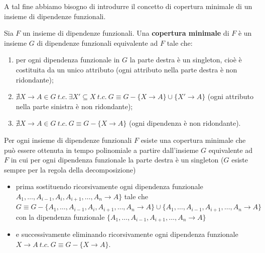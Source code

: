 A tal fine abbiamo bisogno di introdurre il concetto di copertura minimale di un insieme di dipendenze funzionali.
\begin{defn}
Sia $F$ un insieme di dipendenze funzionali. Una \textbf{copertura minimale} di $F$ è un insieme $G$ di dipendenze 
funzionali equivalente ad $F$ tale che:
\begin{enumerate}
 \item per ogni dipendenza funzionale in $G$ la parte destra è un singleton, cioè è costituita da un unico
attributo (ogni attributo nella parte destra è non ridondante);
 \item $\nexists X \rightarrow A \in G\ t.c.\ \exists X' \subseteq X\ t.c.\ G \equiv G - \{X \rightarrow A\} 
 \cup \{X' \rightarrow A\}$ (ogni attributo nella parte sinistra è non ridondante);
 \item $\nexists X \rightarrow A \in G\ t.c.\ G \equiv G - \{X \rightarrow A\}$ (ogni dipendenza è non ridondante). 
\end{enumerate}
\end{defn}
Per ogni insieme di dipendenze funzionali $F$ esiste una copertura minimale che può essere ottenuta in tempo polinomiale
a partire dall'insieme $G$ equivalente ad $F$ in cui per ogni dipendenza funzionale la parte destra è un singleton 
($G$ esiste sempre per la regola della decomposizione)
\begin{itemize}
 \item prima sostituendo ricorsivamente ogni dipendenza funzionale $A_1, \ldots, A_{i-1}, A_i, A_{i+1}, \ldots, A_n 
 \rightarrow A\}$ tale che $G \equiv G - \{A_1, \ldots, A_{i-1}, A_i, A_{i+1}, \ldots, A_n \rightarrow A\} \cup 
 \{A_1, \ldots, A_{i-1}, A_{i+1}, \ldots, A_n \rightarrow A\}$ con la dipendenza funzionale $\{A_1, \ldots, A_{i-1}, A_{i+1},
 \ldots, A_n \rightarrow A\}$
 \item e successivamente eliminando ricorsivamente ogni dipendenza funzionale $X \rightarrow A\ t.c.\ G \equiv G- 
 \{X \rightarrow A\}$.
\end{itemize}
 
